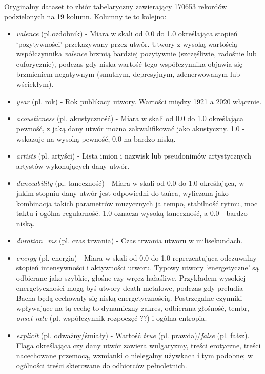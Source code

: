 \documentclass[a4paper,12pt]{article}
\numberwithin{figure}{section}
\begin{document}
    Oryginalny dataset to zbiór tabelaryczny zawierający 170653 rekordów podzielonych na 19 kolumn. Kolumny te to kolejno:
    \begin{itemize}
        \item \textit{valence} (pl.ozdobnik) - Miara w skali od 0.0 do 1.0 określająca stopień `pozytywności' przekazywany przez utwór. Utwory z wysoką wartością współczynnika \textit{valence} brzmią bardziej pozytywnie (szczęśliwie, radośnie lub euforycznie), podczas gdy niska wartość tego współczynnika objawia się brzmieniem negatywnym (smutnym, depresyjnym, zdenerwowanym lub wściekłym).
        \item \textit{year} (pl. rok) - Rok publikacji utwory. Wartości między 1921 a 2020 włącznie.
        \item \textit{acousticness} (pl. akustyczność) - Miara w skali od 0.0 do 1.0 określająca pewność, z jaką dany utwór można zakwalifikować jako akustyczny. 1.0 - wskazuje na wysoką pewność, 0.0 na bardzo niską.
        \item \textit{artists} (pl. artyści) - Lista imion i nazwisk lub pseudonimów artystycznych artystów wykonujących dany utwór.
        \item \textit{danceability} (pl. taneczność) - Miara w skali od 0.0 do 1.0 określająca, w jakim stopniu dany utwór jest odpowiedni do tańca, wyliczana jako kombinacja takich parametrów muzycznych ja tempo, stabilność rytmu, moc taktu i ogólna regularność. 1.0 oznacza wysoką taneczność, a 0.0 - bardzo niską.
        \item \textit{duration\_ms} (pl. czas trwania) - Czas trwania utworu w milisekundach.
        \item \textit{energy} (pl. energia) - Miara w skali od 0.0 do 1.0 reprezentująca odczuwalny stopień intensywności i aktywności utworu. Typowy utwory `energetyczne' są odbierane jako szybkie, głośne czy wręcz hałaśliwe. Przykładem wysokiej energetyczności mogą byś utwory death-metalowe, podczas gdy preludia Bacha będą cechowały się niską energetycznością. Postrzegalne czynniki wpływające na tą cechę to dynamiczny zakres, odbierana głośność, tembr, \textit{onset rate} (pl. współczynnik rozpoczęć ??) i ogólna entropia.
        \item \textit{explicit} (pl. odważny/śmiały) - Wartość \textit{true} (pl. prawda)/\textit{false} (pl. fałsz). Flaga określająca czy dany utwór zawiera wulgaryzmy, treści erotyczne, treści nacechowane przemocą, wzmianki o nielegalny używkach i tym podobne; w ogólności treści skierowane do odbiorców pełnoletnich.

\end{itemize}
\end{document}
